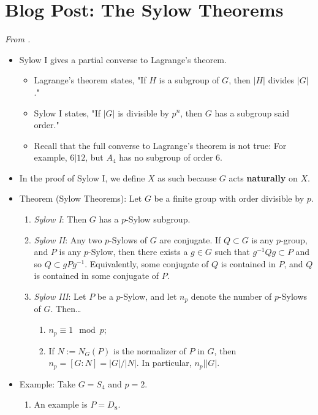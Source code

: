\documentclass[../notes.tex]{subfiles}
\begin{document}
\section{Blog Post: The Sylow Theorems}
\emph{From \textcite{bib:Calegari}.}
\begin{itemize}
    \item {}Sylow I gives a partial converse to Lagrange's theorem.
    \begin{itemize}
        \item Lagrange's theorem states, "If $H$ is a subgroup of $G$, then $|H|$ divides $|G|$."
        \item Sylow I states, "If $|G|$ is divisible by $p^n$, then $G$ has a subgroup said order."
        \item Recall that the full converse to Lagrange's theorem is not true: For example, $6|12$, but $A_4$ has no subgroup of order 6.
    \end{itemize}
    \item In the proof of Sylow I, we define $X$ as such because $G$ acts \textbf{naturally} on $X$.
    \item Theorem (Sylow Theorems): Let $G$ be a finite group with order divisible by $p$.
    \begin{enumerate}
        \item \emph{Sylow I}: Then $G$ has a $p$-Sylow subgroup.
        \item \emph{Sylow II}: Any two $p$-Sylows of $G$ are conjugate. If $Q\subset G$ is any $p$-group, and $P$ is any $p$-Sylow, then there exists a $g\in G$ such that $g^{-1}Qg\subset P$ and so $Q\subset gPg^{-1}$. Equivalently, some conjugate of $Q$ is contained in $P$, and $Q$ is contained in some conjugate of $P$.
        \item \emph{Sylow III}: Let $P$ be a $p$-Sylow, and let $n_p$ denote the number of $p$-Sylows of $G$. Then\dots
        \begin{enumerate}
            \item $n_p\equiv 1\mod p$;
            \item If $N:=N_G(P)$ is the normalizer of $P$ in $G$, then $n_p=[G:N]=|G|/|N|$. In particular, $n_p\big||G|$.
        \end{enumerate}
    \end{enumerate}
    \item Example: Take $G=S_4$ and $p=2$.
    \begin{enumerate}
        \item An example is $P=D_8$.

\end{enumerate}
\end{itemize}
\end{document}
